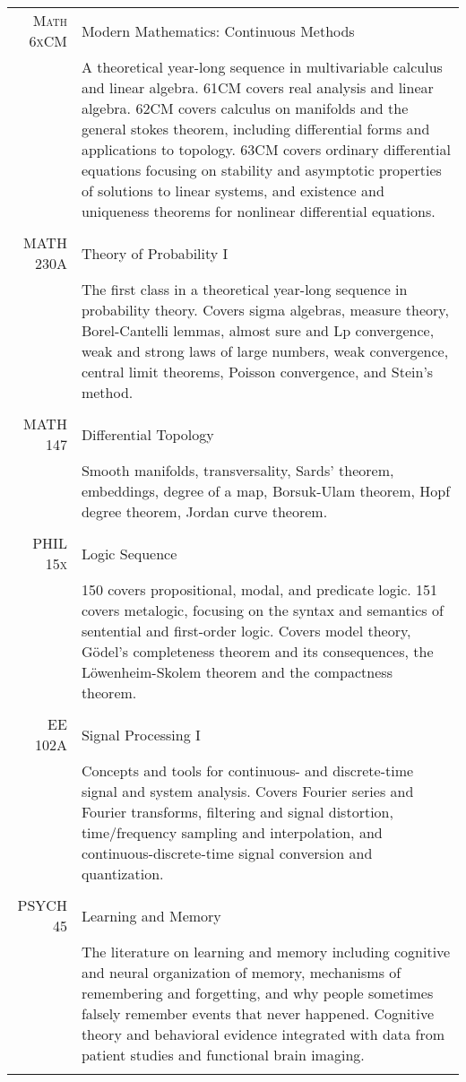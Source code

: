 \documentclass[letterpaper,10pt]{article}
\begin{document}
\begin{tabular}{r|p{13.3cm}}
  \textsc{Math 6xCM} &Modern Mathematics: Continuous Methods \\&\footnotesize{A theoretical year-long sequence in multivariable calculus and linear algebra. 61CM covers real analysis and linear algebra. 62CM covers calculus on manifolds and the general stokes theorem, including differential forms and applications to topology. 63CM covers ordinary differential equations focusing on stability and asymptotic properties of solutions to linear systems, and existence and uniqueness theorems for nonlinear differential equations.}\\\multicolumn{2}{c}{} \\
    \textsc{MATH 230A} & Theory of Probability I \\&\footnotesize{The first class in a theoretical year-long sequence in probability theory. Covers sigma algebras, measure theory, Borel-Cantelli lemmas, almost sure and Lp convergence, weak and strong laws of large numbers, weak convergence, central limit theorems, Poisson convergence, and Stein's method.}\\\multicolumn{2}{c}{} \\ 
  \textsc{MATH 147} & Differential Topology \\&\footnotesize{Smooth manifolds, transversality, Sards' theorem, embeddings, degree of a map, Borsuk-Ulam theorem, Hopf degree theorem, Jordan curve theorem.}\\\multicolumn{2}{c}{} \\ 
  \textsc{PHIL 15x} & Logic Sequence \\&\footnotesize{150 covers propositional, modal, and predicate logic. 151 covers metalogic, focusing on the syntax and semantics of sentential and first-order logic. Covers model theory, G\"odel's completeness theorem and its consequences, the L\"owenheim-Skolem theorem and the compactness theorem.}\\\multicolumn{2}{c}{} \\
    \textsc{EE 102A} & Signal Processing I \\&\footnotesize{Concepts and tools for continuous- and discrete-time signal and system analysis. Covers Fourier series and Fourier transforms, filtering and signal distortion, time/frequency sampling and interpolation, and continuous-discrete-time signal conversion and quantization.}\\\multicolumn{2}{c}{} \\
   \textsc{PSYCH 45} & Learning and Memory \\&\footnotesize{The literature on learning and memory including cognitive and neural organization of memory, mechanisms of remembering and forgetting, and why people sometimes falsely remember events that never happened. Cognitive theory and behavioral evidence integrated with data from patient studies and functional brain imaging.}\\\multicolumn{2}{c}{} \\



\end{tabular}
\end{document}
